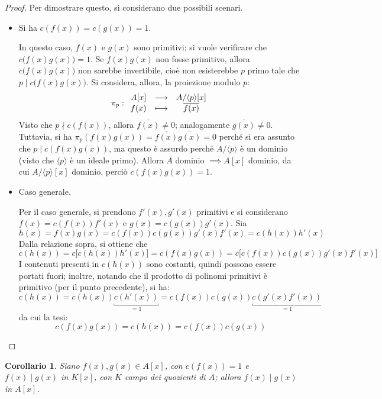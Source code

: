 \documentclass[12pt]{scrartcl}
\theoremstyle{style}
\newtheorem{corollario}{Corollario}[teorema]
\numberwithin{equation}{subsection}
\begin{document}
	\begin{proof}
		Per dimostrare questo, si considerano due possibili scenari.
		\begin{itemize}
			\item Si ha $c(f(x))=c(g(x)) = 1$.

				In questo caso, $f(x) $ e $g(x)$ sono primitivi; si vuole verificare che $c\big(f(x) g(x)\big) = 1$.
				Se $f(x) g(x)$ non fosse primitivo, allora $c\big(f(x)g(x)\big)$ non sarebbe invertibile, cio\`e non esisterebbe $p$ primo tale che $p  \mid c\big(f(x)g(x)\big)$.
				Si considera, allora, la proiezione modulo $p$:
				\[
				\pi_{p} :
				\begin{array}
					{c c c}
					A[x] &\longrightarrow & A / \langle p \rangle [x] \\
					f(x) &\longmapsto & \overline{f(x)}
				\end{array}
				\] 
				Visto che $p \nmid c(f(x))$, allora $\overline{f(x)}\neq 0$; analogamente $\overline{g(x)}\neq 0$.
				Tuttavia, si ha $\pi_p (f(x)g(x)) = \overline{f(x)}\overline{g(x)} = 0$ perch\'e si era assunto che $p \mid c(f(x)g(x))$, ma questo \`e assurdo perch\'e $A / \langle p \rangle$ \`e un dominio (visto che $\langle p \rangle$ \`e un ideale primo).
				Allora $A$ dominio $\implies A[x]$ dominio, da cui $A / \langle p \rangle [x]$ dominio, perci\`o $c(f(x)g(x)) = 1$.
			\item Caso generale.
				
				Per il caso generale, si prendono $f'(x),g'(x)$ primitivi e si considerano $f(x) = c(f(x)) f'(x)$ e $g(x) = c(g(x)) g'(x)$.
				Sia
				\[
				h(x) = f(x)g(x) = c(f(x)) c(g(x)) g'(x) f'(x)=c(h(x)) h'(x)
				\] 
Dalla relazione sopra, si ottiene che
\[
	c(h(x))=c\big[c(h(x)) h'(x)\big]= c(f(x)g(x))=c\big[c(f(x)) c(g(x)) g'(x) f'(x)\big]
\] 
I contenuti presenti in $c(h(x))$ sono costanti, quindi possono essere portati fuori; inoltre, notando che il prodotto di polinomi primitivi \`e primitivo (per il punto precedente), si ha:
\[
	c(h(x)) = c(h(x)) \underbracket{c(h'(x))}_{=1} =c(f(x))c(g(x)) \underbracket{c(g'(x)f'(x))}_{=1} 
\] 
 da cui la tesi:
 \[
 c(f(x)g(x)) = c(h(x)) = c(f(x))c(g(x))
 \] 
		\end{itemize}
	\end{proof}
\begin{corollario}\label{corufd1}
	Siano $f(x),g(x) \in A[x]$, con $c(f(x)) =1 $ e $f(x)  \mid g(x)$ in $K[x]$, con $K$ campo dei quozienti di $A$; allora $f(x)  \mid g(x)$ in $A[x]$.
\end{corollario}
\end{document}
